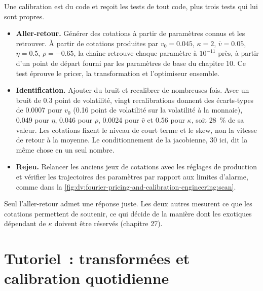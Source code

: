 Une calibration est du code et reçoit les tests de tout code, plus trois tests qui lui sont propres.
\begin{itemize}
\item \textbf{Aller-retour.} Générer des cotations à partir de paramètres connus et les retrouver. À partir de cotations produites par $v_0=0.045$, $\kappa=2$, $\bar v=0.05$,
$\eta=0.5$, $\rho=-0.65$, la chaîne retrouve chaque paramètre à $10^{-11}$ près, à partir d'un point de départ fourni par les paramètres de base du chapitre 10. Ce test éprouve le
pricer, la transformation et l'optimiseur ensemble.
\item \textbf{Identification.} Ajouter du bruit et recalibrer de nombreuses fois. Avec un bruit de 0.3 point de volatilité, vingt recalibrations donnent des écarts-types de
0.0007 pour $v_0$ (0.16 point de volatilité sur la volatilité à la monnaie), 0.049 pour $\eta$, 0.046 pour $\rho$, 0.0024 pour $\bar v$ et 0.56 pour
$\kappa$, soit 28~\% de sa valeur. Les cotations fixent le niveau de court terme et le skew, non la vitesse de retour à la moyenne. Le conditionnement de la
jacobienne, 30 ici, dit la même chose en un seul nombre.
\item \textbf{Rejeu.} Relancer les anciens jeux de cotations avec les réglages de production et vérifier les trajectoires des paramètres par rapport aux limites d'alarme, comme dans
la \cref{fig:dv:fourier-pricing-and-calibration-engineering:scan}.
\end{itemize}
Seul l'aller-retour admet une réponse juste. Les deux autres mesurent ce que les cotations permettent de soutenir, ce qui décide de la manière dont les exotiques dépendant de $\kappa$
doivent être réservés (chapitre 27).

\section{Tutoriel~: transformées et calibration quotidienne}\label{tut:dv:fourier-pricing-and-calibration-engineering:tut}

